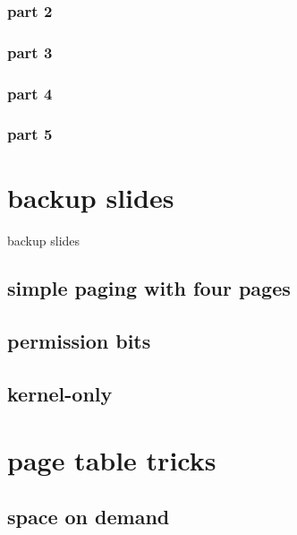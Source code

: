 \subsubsection{part 2}

\subsubsection{part 3}


\subsubsection{part 4}

\subsubsection{part 5}



\section{backup slides}
\begin{frame}{backup slides}
\end{frame}

\subsection{simple paging with four pages}


\subsection{permission bits}


\subsection{kernel-only}


\section{page table tricks}
\subsection{space on demand}



